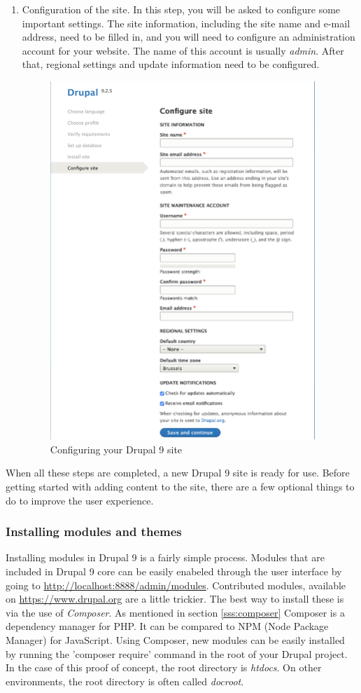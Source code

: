 \begin{enumerate}
	\item Configuration of the site. In this step, you will be asked to configure some important settings. The site information, including the site name and e-mail address, need to be filled in, and you will need to configure an administration account for your website. The name of this account is usually \emph{admin}. After that, regional settings and update information need to be configured.
	\begin{figure}
		\centering
		\includegraphics[width=10cm]{./img/Install_Config.png}
		\caption[Configuring Drupal 9]{Configuring your Drupal 9 site}
	\end{figure}
\end{enumerate}

When all these steps are completed, a new Drupal 9 site is ready for use. Before getting started with adding content to the site, there are a few optional things to do to improve the user experience.

\subsubsection{Installing modules and themes}

Installing modules in Drupal 9 is a fairly simple process. Modules that are included in Drupal 9 core can be easily enabeled through the user interface by going to \url{http://localhost:8888/admin/modules}. Contributed modules, available on \url{https://www.drupal.org} are a little trickier. The best way to install these is via the use of \emph{Composer}. As mentioned in section \ref{sss:composer} Composer is a dependency manager for PHP. It can be compared to NPM (Node Package Manager) for JavaScript. Using Composer, new modules can be easily installed by running the 'composer require' command in the root of your Drupal project. In the case of this proof of concept, the root directory is \emph{htdocs}. On other environments, the root directory is often called \emph{docroot}.

